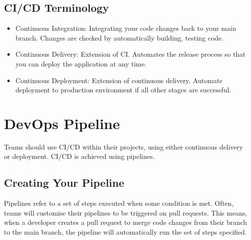 \documentclass[letterpaper,10pt,english]{jupyterBook}
\begin{document}
\subsection{CI/CD Terminology}
\label{\detokenize{chapter_11/devops:ci-cd-terminology}}\begin{itemize}
\item {} 
\sphinxAtStartPar
Continuous Integration: Integrating your code changes back to your
main branch. Changes are checked by automatically building, testing
code.

\item {} 
\sphinxAtStartPar
Continuous Delivery: Extension of CI. Automates the release process
so that you can deploy the application at any time.

\item {} 
\sphinxAtStartPar
Continuous Deployment: Extension of continuous delivery. Automate
deployment to production environment if all other stages are
successful.

\end{itemize}

\sphinxAtStartPar
{}

\sphinxAtStartPar
{}


\section{DevOps Pipeline}
\label{\detokenize{chapter_11/devops:devops-pipeline}}
\sphinxAtStartPar
Teams should use CI/CD within their projects, using either continuous
delivery or deployment. CI/CD is achieved using pipelines.


\subsection{Creating Your Pipeline}
\label{\detokenize{chapter_11/devops:creating-your-pipeline}}
\sphinxAtStartPar
Pipelines refer to a set of steps executed when some condition is met.
Often, teams will customise their pipelines to be triggered on pull
requests. This means, when a developer creates a pull request to merge
code changes from their branch to the main branch, the pipeline will
automatically run the set of steps specified.
\end{document}

